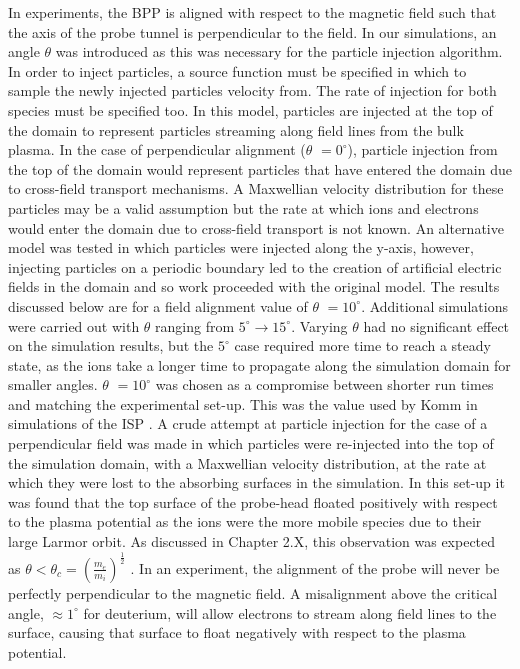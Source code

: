 In experiments, the BPP is aligned with respect to the magnetic field such that the axis of the probe tunnel is perpendicular to the field. In our simulations, an angle $\theta$ was introduced as this was necessary for the particle injection algorithm. In order to inject particles, a source function must be specified in which to sample the newly injected particles velocity from. The rate of injection for both species must be specified too. In this model, particles are injected at the top of the domain to represent particles streaming along field lines from the bulk plasma. In the case of perpendicular alignment ($\theta$ $={0} ^{\circ}$), particle injection from the top of the domain would represent particles that have entered the domain due to cross-field transport mechanisms. A Maxwellian velocity distribution for these particles may be a valid assumption but the rate at which ions and electrons would enter the domain due to cross-field transport is not known. An alternative model was tested in which particles were injected along the y-axis, however, injecting particles on a periodic boundary led to the creation of artificial electric fields in the domain and so work proceeded with the original model. The results discussed below are for a field alignment value of $\theta$ $={10} ^{\circ}$. Additional simulations were carried out with $\theta$ ranging from  ${5} ^{\circ} \to {15} ^{\circ}$. Varying $\theta$ had no significant effect on the simulation results, but the  ${5} ^{\circ}$ case required more time to reach a steady state, as the ions take a longer time to propagate along the simulation domain for smaller angles. $\theta$ $={10} ^{\circ}$ was chosen as a compromise between shorter run times and matching the experimental set-up. This was the value used by Komm in simulations of the ISP \cite{komm-ION}.
A crude attempt at particle injection for the case of a perpendicular field was made in which particles were re-injected into the top of the simulation domain, with a Maxwellian velocity distribution, at the rate at which they were lost to the absorbing surfaces in the simulation. In this set-up it was found that the top surface of the probe-head floated positively with respect to the plasma potential as the ions were the more mobile species due to their large Larmor orbit. As discussed in Chapter 2.X,  this observation was expected as $\theta < \theta_c =  {\left(\frac{m_e}{m_i}\right)}^{\frac{1}{2}}$ \cite{stangeby-angles}. In an experiment, the alignment of the probe will never be perfectly perpendicular to the magnetic field. A misalignment above the critical angle, $\approx {1} ^{\circ}$ for deuterium, will allow electrons to stream along field lines to the surface, causing that surface to float negatively with respect to the plasma potential.


